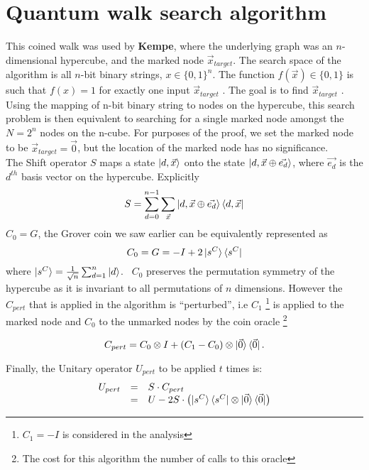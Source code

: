 \documentclass{article}
\begin{document}
\section{Quantum walk search algorithm}
This coined walk was used by \textbf{Kempe}, where the underlying graph was an $n$-dimensional hypercube, and the marked node $\vec{x}_{target}$.
The search space of the algorithm is all $n$-bit binary strings, $x \in \{0,1\}^n$. The function $f(\vec{x}) \in \{0,1\}$ is such that $f(x) = 1$ for exactly one input $\vec{x}_{target}$ . The goal is to find $\vec{x}_{target}$ . Using the mapping of n-bit binary string to nodes on the hypercube, this search problem is then equivalent to searching for a single marked node amongst the $N = 2^n$ nodes on the n-cube. For purposes of the proof, we set the marked node to be $\vec{x}_{target} = \vec{0}$, but the location of the marked node has no significance.\\
The Shift operator $S$ maps a state $\ket{d, \vec{x}}$ onto the state $\ket{d, \vec{x} \oplus \vec{e_d}}$, where
$\vec{e_d}$ is the $d^{th}$ basis vector on the hypercube. Explicitly
\begin{equation}
S = \sum_{d=0}^{n-1}{\sum_{\vec{x}}{
\ket{d, \vec{x} \oplus \vec{e_d}}\bra{d, \vec{x}}}}    
\end{equation}
$C_0 = G$, the Grover coin we saw earlier can be equivalently represented as
\begin{equation}
C_0  = G = -I + 2\ket{s^C}\bra{s^C}
\end{equation}
where $\ket{s^C} = \frac{1}{\sqrt{n}} \sum_{d=1}^{n}{\ket{d}}$.~ 
$C_0$ preserves the permutation symmetry of the hypercube as it is invariant to all permutations of $n$ dimensions.
However the $C_{pert}$ that is applied in the algorithm is ``perturbed'', i.e $C_1$ \footnote{$C_1 = -I$ is considered in the analysis} is applied to the marked node and $C_0$ to the unmarked nodes by the coin oracle \footnote{The cost for this algorithm the number of calls to this oracle}

\begin{equation}
C_{pert} = C_0 \otimes I + \left(C_1 -
C_0\right)\otimes\ket{\vec{0}}\bra{\vec{0}}.
\end{equation}

Finally, the Unitary operator $U_{pert}$ to be applied $t$ times is:
\begin{equation}
\begin{array}{rcl}
U_{pert}  & = & S \cdot C_{pert}\\
& = & U - 2S \cdot \left(\ket{s^C}\bra{s^C} \otimes \ket{\vec{0}}\bra{\vec{0}}
\right)
\end{array}
\end{equation}
\end{document}
